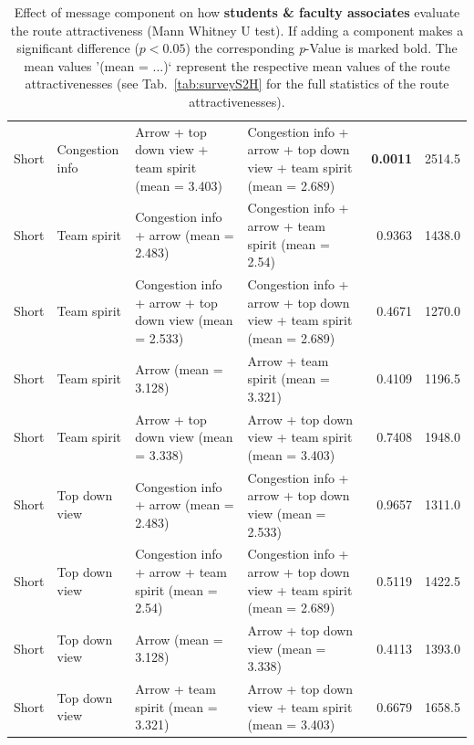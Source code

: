 \begin{table}
\begin{scriptsize}
\begin{tabular}{llllrr}
  Short & Congestion info & Arrow + top down view + team spirit (mean = 3.403) & Congestion info + arrow + top down view + team spirit (mean = 2.689) & \textbf{0.0011} & 2514.5 \\ 
  Short & Team spirit & Congestion info + arrow (mean = 2.483) & Congestion info + arrow + team spirit (mean = 2.54) & 0.9363 & 1438.0 \\ 
  Short & Team spirit & Congestion info + arrow + top down view (mean = 2.533) & Congestion info + arrow + top down view + team spirit (mean = 2.689) & 0.4671 & 1270.0 \\ 
  Short & Team spirit & Arrow (mean = 3.128) & Arrow + team spirit (mean = 3.321) & 0.4109 & 1196.5 \\ 
  Short & Team spirit & Arrow + top down view (mean = 3.338) & Arrow + top down view + team spirit (mean = 3.403) & 0.7408 & 1948.0 \\ 
  Short & Top down view & Congestion info + arrow (mean = 2.483) & Congestion info + arrow + top down view (mean = 2.533) & 0.9657 & 1311.0 \\ 
  Short & Top down view & Congestion info + arrow + team spirit (mean = 2.54) & Congestion info + arrow + top down view + team spirit (mean = 2.689) & 0.5119 & 1422.5 \\ 
  Short & Top down view & Arrow (mean = 3.128) & Arrow + top down view (mean = 3.338) & 0.4113 & 1393.0 \\ 
  Short & Top down view & Arrow + team spirit (mean = 3.321) & Arrow + top down view + team spirit (mean = 3.403) & 0.6679 & 1658.5 \\ 
\hline
\end{tabular}

\end{scriptsize}

\caption[]{Effect of message component on how \textbf{students \& faculty associates} evaluate the route attractiveness (Mann Whitney U test). If adding a component makes a significant difference ($p<0.05$) the corresponding \textit{p}-Value is marked bold. The mean values '(mean = ...)` represent the respective mean values of the route attractivenesses (see Tab.~\ref{tab:surveyS2H} for the full statistics of the route attractivenesses).}
\label{tab:surveyS2A}
\end{table}


